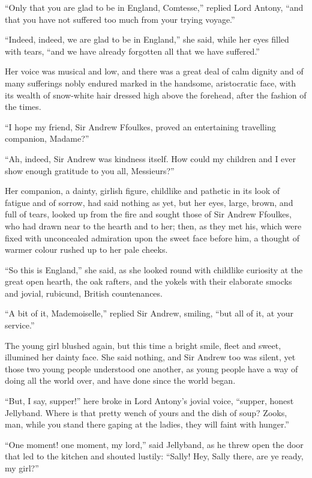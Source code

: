 \documentclass[paper=5.5in:8.5in,BCOR=7mm,twoside,DIV=calc,12pt,usegeometry,chapterprefix,endperiod,headings=big]{scrbook}
\begin{document}
\enquote{Only that you are glad to be in England, Comtesse,} replied Lord Antony, \enquote{and that you have not suffered too much from your trying voyage.}

\enquote{Indeed, indeed, we are glad to be in England,} she said, while her eyes filled with tears, \enquote{and we have already forgotten all that we have suffered.}

Her voice was musical and low, and there was a great deal of calm dignity and of many sufferings nobly endured marked in the handsome, aristocratic face, with its wealth of snow-white hair dressed high above the forehead, after the fashion of the times.

\enquote{I hope my friend, Sir Andrew Ffoulkes, proved an entertaining travelling companion, Madame?}

\enquote{Ah, indeed, Sir Andrew was kindness itself. How could my children and I ever show enough gratitude to you all, Messieurs?}

Her companion, a dainty, girlish figure, childlike and pathetic in its look of fatigue and of sorrow, had said nothing as yet, but her eyes, large, brown, and full of tears, looked up from the fire and sought those of Sir Andrew Ffoulkes, who had drawn near to the hearth and to her; then, as they met his, which were fixed with unconcealed admiration upon the sweet face before him, a thought of warmer colour rushed up to her pale cheeks.

\enquote{So this is England,} she said, as she looked round with childlike curiosity at the great open hearth, the oak rafters, and the yokels with their elaborate smocks and jovial, rubicund, British countenances.

\enquote{A bit of it, Mademoiselle,} replied Sir Andrew, smiling, \enquote{but all of it, at your service.}

The young girl blushed again, but this time a bright smile, fleet and sweet, illumined her dainty face. She said nothing, and Sir Andrew too was silent, yet those two young people understood one another, as young people have a way of doing all the world over, and have done since the world began.

\enquote{But, I say, supper!} here broke in Lord Antony's jovial voice, \enquote{supper, honest Jellyband. Where is that pretty wench of yours and the dish of soup? Zooks, man, while you stand there gaping at the ladies, they will faint with hunger.}

\enquote{One moment! one moment, my lord,} said Jellyband, as he threw open the door that led to the kitchen and shouted lustily: \enquote{Sally! Hey, Sally there, are ye ready, my girl?}
\end{document}
